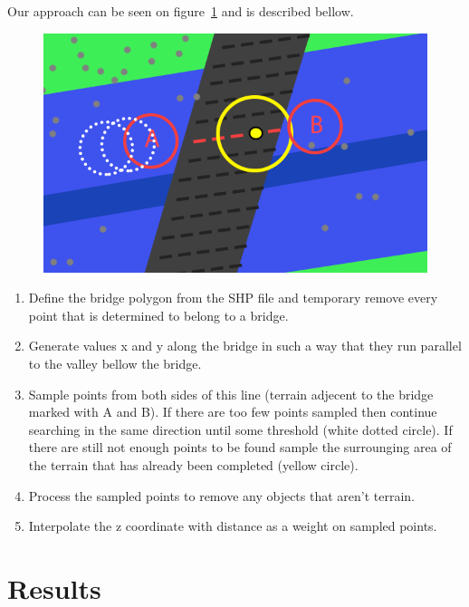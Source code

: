 \documentclass{egpubl-eurovis-star}
\begin{document}
Our approach can be seen on figure~\ref{fig2} and is described bellow.
\begin{figure}[ht]
    \centering
    \includegraphics[width=1\columnwidth]{bridge.png}
    \caption{ }
    \label{fig2}
\end{figure}
\begin{enumerate}
\item{Define the bridge polygon from the SHP file and temporary remove every point that is determined to belong to a bridge.}
\item{Generate values x and y along the bridge in such a way that they run parallel to the valley bellow the bridge. }
\item{Sample points from both sides of this line (terrain adjecent to the bridge marked with A and B). 
If there are too few points sampled then continue searching in the same direction until some threshold (white dotted circle).
If there are still not enough points to be found sample the surrounging area of the terrain that has already been completed (yellow circle).}
\item{Process the sampled points to remove any objects that aren't terrain.}
\item{Interpolate the z coordinate with distance as a weight on sampled points.}
\end{enumerate}

\section{Results}
\end{document}
